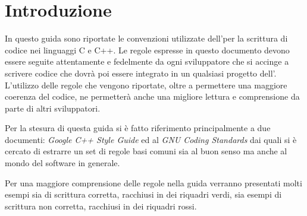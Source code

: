 %
%

\section{Introduzione}\label{sec:overview}

In questo guida sono riportate le convenzioni utilizzate dell'\associazione per la scrittura di codice nei linguaggi C e C++.
Le regole espresse in questo documento devono essere seguite attentamente e fedelmente da ogni sviluppatore che si accinge a scrivere codice che dovrà poi essere integrato in un qualsiasi progetto dell'\sigla.
L'utilizzo delle regole che vengono riportate, oltre a permettere una maggiore coerenza del codice, ne permetterà anche una migliore lettura e comprensione da parte di altri sviluppatori.

Per la stesura di questa guida si è fatto riferimento principalmente a due documenti: \emph{Google C++ Style Guide}\cite{codestyle:google} ed al \emph{GNU Coding Standards}\cite{codestyle:gnu} dai quali si è cercato di estrarre un set di regole basi comuni sia al buon senso ma anche al mondo del software in generale.

Per una maggiore comprensione delle regole nella guida verranno presentati molti esempi sia di scrittura corretta, racchiusi in dei riquadri verdi, sia esempi di scrittura non corretta, racchiusi in dei riquadri rossi.